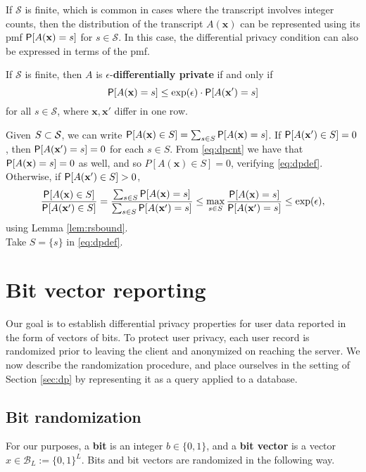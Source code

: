 \documentclass[11pt,draft]{article}
\newcommand{\Ssp}{\mathcal{S}}
\newcommand{\Bsp}{\mathcal{B}}
\newcommand{\xv}{\mathbf{x}}
\begin{document}

If $\Ssp$ is finite, which is common in cases where the transcript involves integer counts, then the distribution of the transcript $A(\xv)$ can be represented using its pmf $\P[A(\xv) = s]$ for $s \in \Ssp$.
In this case, the differential privacy condition can also be expressed in terms of the pmf.
\begin{prop} \label{prop:dpcnt}
If $\Ssp$ is finite, then $A$ is $\epsilon$-\textbf{differentially private} if and only if
\begin{equation} \label{eq:dpcnt}
\P[A(\xv) = s] \leq \exp(\epsilon) \cdot \P[A(\xv') = s]
\end{equation}
for all $s\in\Ssp$, where $\xv,\xv'$ differ in one row.
\end{prop}
\begin{pf}
\pfleftdir
Given $S \cont \Ssp$, we can write
$\P[A(\xv) \in S] = \sum_{s \in S} \P[A(\xv) = s]$.
If $\P[A(\xv') \in S] = 0$, then $\P[A(\xv') = s] = 0$ for each $s \in S$.
From \eqref{eq:dpcnt} we have that $\P[A(\xv) = s] = 0$ as well, and so $P[A(\xv) \in S] = 0$, verifying \eqref{eq:dpdef}.
Otherwise, if $\P[A(\xv') \in S] > 0$,
\[ \frac{\P[A(\xv) \in S]}{\P[A(\xv') \in S]}
= \frac{\sum_{s \in S} \P[A(\xv) = s]}{\sum_{s \in S} \P[A(\xv') = s]}
\leq \max_{s \in S} \frac{\P[A(\xv) = s]}{\P[A(\xv') = s]}
\leq \exp(\epsilon), \]
using Lemma \ref{lem:rsbound}.\\
\pfrightdir Take $S = \{s\}$ in \eqref{eq:dpdef}.
\end{pf}


\section{Bit vector reporting}

Our goal is to establish differential privacy properties for user data reported
in the form of vectors of bits.
To protect user privacy, each user record is randomized prior to leaving the
client and anonymized on reaching the server.
We now describe the randomization procedure, and place ourselves in the setting
of Section \ref{sec:dp} by representing it as a query applied to a database.

\subsection{Bit randomization}

For our purposes, a \textbf{bit} is an integer $b \in \{0,1\}$, and a
\textbf{bit vector} is a vector $x \in \Bsp_L := \{0,1\}^L$.
Bits and bit vectors are randomized in the following way.
\end{document}
